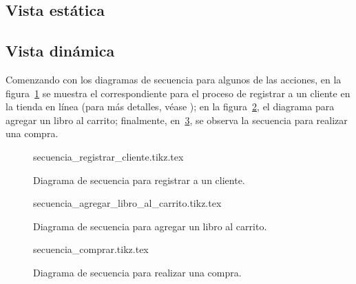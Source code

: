 \subsection{Vista estática}

\subsection{Vista dinámica}
Comenzando con los diagramas de secuencia para algunos de las acciones, en la
figura~\ref{lib_fig:secuencia_registrar_cliente} se muestra el correspondiente
para el proceso de registrar a un cliente en la tienda en línea (para más
detalles, véase ); en la
figura~\ref{lib_fig:secuencia_agregar_libro_al_carrito}, el diagrama para
agregar un libro al carrito; finalmente, en~\ref{lib_fig:secuencia_comprar},
se observa la secuencia para realizar una compra.

\begin{figure}
  \begin{center}
    {secuencia_registrar_cliente.tikz.tex}
    \caption{Diagrama de secuencia para registrar a un cliente.}
    \label{lib_fig:secuencia_registrar_cliente}
  \end{center}
\end{figure}

\begin{figure}
  \begin{center}
    {secuencia_agregar_libro_al_carrito.tikz.tex}
    \caption{Diagrama de secuencia para agregar un libro al carrito.}
    \label{lib_fig:secuencia_agregar_libro_al_carrito}
  \end{center}
\end{figure}

\begin{figure}
  \begin{center}
    {secuencia_comprar.tikz.tex}
    \caption{Diagrama de secuencia para realizar una compra.}
    \label{lib_fig:secuencia_comprar}
  \end{center}
\end{figure}
